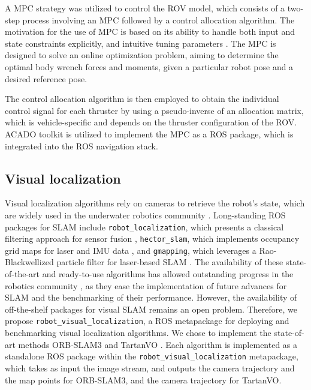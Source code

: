 A \ac{MPC} strategy was utilized to control the \ac{ROV} model, which consists of a two-step process involving an \ac{MPC} followed by a control allocation algorithm. The motivation for the use of MPC is based on its ability to handle both input and state constraints explicitly, and intuitive tuning parameters \cite{mpc_survey}.   
The \ac{MPC} is designed to solve an online optimization problem, aiming to determine the optimal body wrench forces and moments, given a particular robot pose and a desired reference pose. 

The control allocation algorithm is then employed to obtain the individual control signal for each thruster by using a pseudo-inverse of an allocation matrix, which is vehicle-specific and depends on the thruster configuration of the \ac{ROV}. ACADO toolkit \cite{acado} is utilized to implement the \ac{MPC} as a  \ac{ROS} package, which is integrated into the  \ac{ROS} navigation stack.

\subsection{Visual localization}
Visual localization algorithms rely on cameras to retrieve the robot's state, which are widely used in the underwater robotics community \cite{olaya_survey}. %
Long-standing ROS packages for SLAM include \texttt{robot\_localization}, which presents a classical filtering approach for sensor fusion \cite{vSLAM:moore2016robot_localizationROS}, \texttt{hector\_slam}, which implements occupancy grid maps for laser and IMU data \cite{vSLAM:hectorSLAM}, and \texttt{gmapping}, which leverages a Rao-Blackwellized particle filter for laser-based SLAM  \cite{vSLAM:gmapping}.
The availability of these state-of-the-art and ready-to-use algorithms has allowed outstanding progress in the robotics community \cite{vSLAM:lidarreview,vSLAM:hectorreview1,vSLAM:hectorreview2,vSLAM:gmappingreview1,vSLAM:gmappingreview2}, as they ease the implementation of future advances for SLAM and the benchmarking of their performance. However, the availability of off-the-shelf packages for visual SLAM remains an open problem.
Therefore, we propose \texttt{robot\_visual\_localization}, a ROS metapackage for deploying and benchmarking visual localization algorithms. We chose to implement the state-of-art methods ORB-SLAM3 \cite{vSLAM:orb3} and TartanVO \cite{vSLAM:tartanvo}. Each algorithm is implemented as a standalone ROS package within the \texttt{robot\_visual\_localization} metapackage, which takes as input the image stream, and outputs the camera trajectory and the map points for ORB-SLAM3, and the camera trajectory for TartanVO. 

